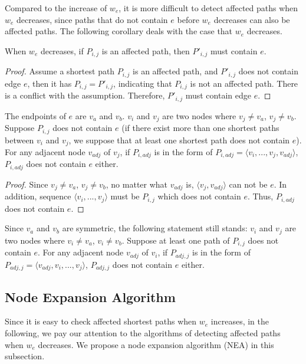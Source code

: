 Compared to the increase of $w_e$, it is more difficult to detect affected paths when $w_e$ decreases, since paths that do not contain $e$ before $w_e$ decreases can also be affected paths.
The following corollary deals with the case that $w_e$ decreases.

\begin{corollary}
\label{corollary:weight-decrease}
When $w_e$ decreases, if $P_{i,j}$ is an affected path, then $P'_{i,j}$ must contain $e$.
\end{corollary}
\begin{proof}
Assume a shortest path $P_{i,j}$ is an affected path, and $P'_{i,j}$ does not contain edge $e$, then it has $P_{i,j}=P'_{i,j}$, indicating that $P_{i,j}$ is not an affected path. There is a conflict with the assumption. Therefore, $P'_{i,j}$ must contain edge $e$.
\end{proof}

\begin{corollary}
\label{thm:node-node}
The endpoints of $e$ are $v_a$ and $v_b$. $v_i$ and $v_j$ are two nodes where $v_j\neq v_a$, $v_j\neq v_b$. Suppose $P_{i,j}$ does not contain $e$ (if there exist more than one shortest paths between $v_i$ and $v_j$, we suppose that at least one shortest path does not contain $e$).
For any adjacent node $v_{adj}$ of $v_j$, if $P_{i,adj}$ is in the form of $P_{i,adj}=\langle v_i,...,v_j,v_{adj}\rangle$, $P_{i,adj}$ does not contain $e$ either.
\end{corollary}


\begin{proof}
Since $v_j\neq v_a$, $v_j\neq v_b$, no matter what $v_{adj}$ is, $\langle v_j,v_{adj} \rangle$ can not be $e$. In addition, sequence $\langle v_i,...,v_j\rangle$ must be $P_{i,j}$ which does not contain $e$. Thus, $P_{i,{adj}}$ does not contain $e$.
\end{proof}

Since $v_a$ and $v_b$ are symmetric, the following statement still stands: $v_i$ and $v_j$ are two nodes where $v_i\neq v_a$, $v_i\neq v_b$. Suppose at least one path of $P_{i,j}$ does not contain $e$.
For any adjacent node $v_{adj}$ of $v_i$, if $P_{{adj},j}$ is in the form of $P_{adj,j}=\langle v_{adj},v_i,...,v_j\rangle$, $P_{adj,j}$ does not contain $e$ either.
\subsection{Node Expansion Algorithm}
Since it is easy to check affected shortest paths when $w_e$ increases, in the following, we pay our attention to the algorithms of detecting affected paths when $w_e$ decreases.
We propose a node expansion algorithm (NEA) in this subsection.

